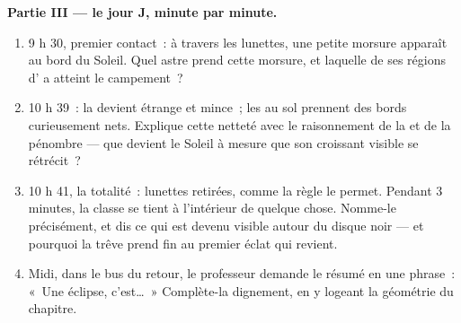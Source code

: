\begin{problem}
\medskip\noindent\textbf{Partie III --- le jour J, minute par
minute.}
\begin{enumerate}[resume]
  \item 9 h 30, premier contact~: à travers les lunettes, une
        petite morsure apparaît au bord du Soleil. Quel astre prend
        cette morsure, et laquelle de ses régions d' a atteint
        le campement~?
  \item 10 h 39~: la  devient étrange et mince~; les 
        au sol prennent des bords curieusement nets. Explique cette
        netteté avec le raisonnement de la  et de la
        pénombre --- que devient le Soleil à mesure que son croissant
        visible se rétrécit~?
  \item 10 h 41, la totalité~: lunettes retirées, comme la règle le
        permet. Pendant $3$ minutes, la classe se tient à
        l'intérieur de quelque chose. Nomme-le précisément, et dis
        ce qui est devenu visible autour du disque noir --- et
        pourquoi la trêve prend fin au premier éclat qui revient.
  \item Midi, dans le bus du retour, le professeur demande le
        résumé en une phrase~: «~Une éclipse, c'est\dots~»
        Complète-la dignement, en y logeant la géométrie du
        chapitre.
\end{enumerate}
\end{problem}

